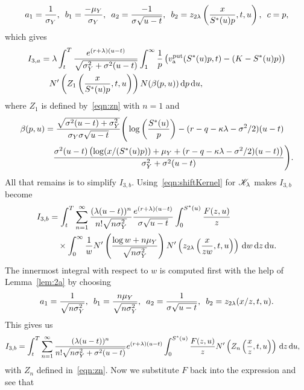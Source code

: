 		$$
			a_1 = \frac{1}{\sigma_Y}, \enskip b_1 = \frac{-\mu_Y}{\sigma_Y}, \enskip a_2 = \frac{-1}{\sigma\sqrt{u-t}}, \enskip
			b_2 = z_{2\lambda}\left( \frac{x}{S^*(u)p}, t, u \right), \enskip c = p,
		$$
		which gives
		\begin{align*}
			 I_{3,a} &=  \lambda  \int_t^T \frac{e^{(r+\lambda)(u-t)}}{\sqrt{\sigma_Y^2 + \sigma^2(u-t)}} \int_1^\infty \frac{1}{p} \left( v_{\text{a}}^{\text{put}}(S^*(u)p,t) - (K-S^*(u)p) \right)  \\
			&\quad {} N'\left( Z_1 \left( \frac{x}{S^*(u)p}, t, u \right)\right)N(\beta(p,u)) \, \mathrm d p \, \mathrm d u,
		\end{align*}	
		where $Z_1$ is defined by~\eqref{eqn:zn} with $n=1$ and
		\begin{equation}
			\label{eqn:betaA}
			\begin{split}
			\beta(p,u) &= \frac{\sqrt{\sigma^2(u-t) + \sigma_Y^2}}{\sigma_Y\sigma\sqrt{u-t}}\Bigg( \log\left(\frac{S^*(u)}{p}\right) - (r-q-\kappa\lambda-\sigma^2/2)(u-t) \\
			&\quad {} \frac{\sigma^2(u-t)\left( \log(x/(S^*(u)p)) + \mu_Y + (r-q-\kappa\lambda - \sigma^2/2)(u-t) \right)}{\sigma_Y^2 + \sigma^2(u-t)} \Bigg).
			\end{split}
		\end{equation}
		All that remains is to simplify $I_{3,b}$. Using~\eqref{eqn:shiftKernel} for $\mathscr K_\lambda$ makes $I_{3,b}$ become
		\begin{align*}
			I_{3,b} &= \int_t^T \displaystyle\sum\limits_{n=1}^{\infty} \frac{(\lambda(u-t))^n}{n!\sqrt{n\sigma_Y^2}}\frac{e^{(r+\lambda)(u-t)}}{\sigma\sqrt{u-t}} \int_0^{S^*(u)} \frac{F(z,u)}{z}  \\
			&\quad {} \times \int_0^\infty  \frac{1}{w}N'\left( \frac{\log w + n\mu_Y}{\sqrt{n\sigma_Y^2}} \right)N'\left( z_{2\lambda}\left( \frac{x}{zw},t,u \right) \right) \, \mathrm d w \, \mathrm d z \, \mathrm d u.
		\end{align*}
		The innermost integral with respect to $w$ is computed first with the help of Lemma~\ref{lem:2a} by choosing
		$$
			a_1 = \frac{1}{\sqrt{n\sigma_Y^2}}, \enskip b_1 = \frac{n\mu_Y}{\sqrt{n\sigma_Y^2}}, \enskip a_2 = \frac{1}{\sigma\sqrt{u-t}}, \enskip b_2 = z_{2\lambda}(x/z,t,u).
		$$
		This gives us
		\begin{align*}
			I_{3,b} &= \int_t^T \displaystyle\sum\limits_{n=1}^{\infty} \frac{(\lambda(u-t))^n}{n!\sqrt{n\sigma_Y^2 + \sigma^2(u-t)}}e^{(r+\lambda)(u-t)}\int_0^{S^*(u)} \frac{F(z,u)}{z}  N'\left( Z_n\left( \frac{x}{z},t, u \right) \right)  \, \mathrm d z \, \mathrm d u,
		\end{align*}
		with $Z_n$ defined in~\eqref{eqn:zn}. Now we substitute $F$ back into the expression and see that
